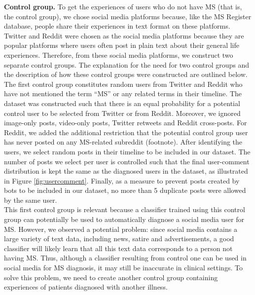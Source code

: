 \documentclass[11pt,a4paper]{article}
\begin{document}
\indent \textbf{Control group.} To get the experiences of users who do not have MS (that is, the control group), we chose social media platforms because, like the MS Register database, people share their experiences in text format on these platforms. Twitter and Reddit were chosen as the social media platforms because they are popular platforms where users often post in plain text about their general life experiences. Therefore, from these social media platforms, we construct two separate control groups. The explanation for the need for two control groups and the description of how these control groups were constructed are outlined below. \\
\indent The first control group constitutes random users from Twitter and Reddit who have not mentioned the term “MS” or any related terms in their timeline. The dataset was constructed such that there is an equal probability for a potential control user to be selected from Twitter or from Reddit. Moreover, we ignored image-only posts, video-only posts, Twitter retweets and Reddit cross-posts. For Reddit, we added the additional restriction that the potential control group user has never posted on any MS-related subreddit (footnote). After identifying the users, we select random posts in their timeline to be included in our dataset. The number of posts we select per user is controlled such that the final user-comment distribution is kept the same as the diagnosed users in the dataset, as illustrated in Figure \ref{fig:usercomment}. Finally, as a measure to prevent posts created by bots to be included in our dataset, no more than 5 duplicate posts were allowed by the same user. \\
\indent This first control group is relevant because a classifier trained using this control group can potentially be used to automatically diagnose a social media user for MS. However, we observed a potential problem: since social media contains a large variety of text data, including news, satire and advertisements, a good classifier will likely learn that all this text data corresponds to a person not having MS. Thus, although a classifier resulting from control one can be used in social media for MS diagnosis, it may still be inaccurate in clinical settings. To solve this problem, we need to create another control group containing experiences of patients diagnosed with another illness. \\
\end{document}
